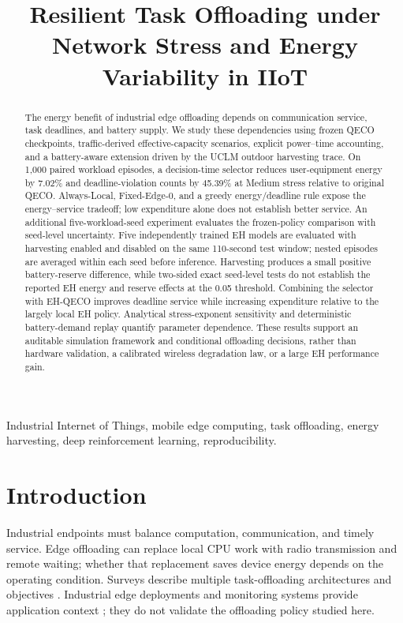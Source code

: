 \documentclass[conference]{IEEEtran}
\begin{document}
\title{Resilient Task Offloading under Network Stress and Energy Variability in IIoT}
\author{}
\maketitle
\begin{abstract}
The energy benefit of industrial edge offloading depends on communication service, task deadlines, and battery supply. We study these dependencies using frozen QECO checkpoints, traffic-derived effective-capacity scenarios, explicit power--time accounting, and a battery-aware extension driven by the UCLM outdoor harvesting trace. On 1,000 paired workload episodes, a decision-time selector reduces user-equipment energy by 7.02\% and deadline-violation counts by 45.39\% at Medium stress relative to original QECO. Always-Local, Fixed-Edge-0, and a greedy energy/deadline rule expose the energy--service tradeoff; low expenditure alone does not establish better service. An additional five-workload-seed experiment evaluates the frozen-policy comparison with seed-level uncertainty. Five independently trained EH models are evaluated with harvesting enabled and disabled on the same 110-second test window; nested episodes are averaged within each seed before inference. Harvesting produces a small positive battery-reserve difference, while two-sided exact seed-level tests do not establish the reported EH energy and reserve effects at the 0.05 threshold. Combining the selector with EH-QECO improves deadline service while increasing expenditure relative to the largely local EH policy. Analytical stress-exponent sensitivity and deterministic battery-demand replay quantify parameter dependence. These results support an auditable simulation framework and conditional offloading decisions, rather than hardware validation, a calibrated wireless degradation law, or a large EH performance gain.
\end{abstract}
\begin{IEEEkeywords}
Industrial Internet of Things, mobile edge computing, task offloading, energy harvesting, deep reinforcement learning, reproducibility.
\end{IEEEkeywords}

\section{Introduction}
Industrial endpoints must balance computation, communication, and timely service. Edge offloading can replace local CPU work with radio transmission and remote waiting; whether that replacement saves device energy depends on the operating condition. Surveys describe multiple task-offloading architectures and objectives \cite{Islam2021_supp11,Wang2020_supp14,Yang2023_supp18}. Industrial edge deployments and monitoring systems provide application context \cite{Donovan2022_supp8,Singh2024_supp3,Mirani2024_supp7}; they do not validate the offloading policy studied here.
\end{document}
